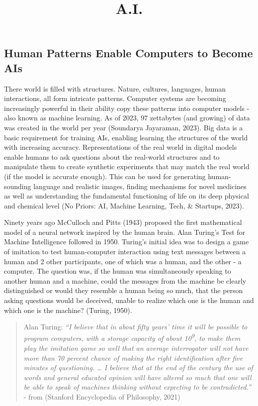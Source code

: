 \documentclass[
  letterpaper,
  DIV=11,
  numbers=noendperiod]{scrartcl}
\title{A.I.}
\author{}
\date{}
\begin{document}
\maketitle

\subsection{Human Patterns Enable Computers to Become
AIs}\label{human-patterns-enable-computers-to-become-ais}

There world is filled with structures. Nature, cultures, languages,
human interactions, all form intricate patterns. Computer systems are
becoming increasingly powerful in their ability copy these patterns into
computer models - also known as machine learning. As of 2023, 97
zettabytes (and growing) of data was created in the world per year
(Soundarya Jayaraman, 2023). Big data is a basic requirement for
training AIs, enabling learning the structures of the world with
increasing accuracy. Representations of the real world in digital models
enable humans to ask questions about the real-world structures and to
manipulate them to create synthetic experiments that may match the real
world (if the model is accurate enough). This can be used for generating
human-sounding language and realistic images, finding mechanisms for
novel medicines as well as understanding the fundamental functioning of
life on its deep physical and chemical level (No Priors: AI, Machine
Learning, Tech, \& Startups, 2023).

Ninety years ago McCulloch and Pitts (1943) proposed the first
mathematical model of a neural network inspired by the human brain. Alan
Turing's Test for Machine Intelligence followed in 1950. Turing's
initial idea was to design a game of imitation to test human-computer
interaction using text messages between a human and 2 other
participants, one of which was a human, and the other - a computer. The
question was, if the human was simultaneously speaking to another human
and a machine, could the messages from the machine be clearly
distinguished or would they resemble a human being so much, that the
person asking questions would be deceived, unable to realize which one
is the human and which one is the machine? (Turing, 1950).

\begin{quote}
Alan Turing: \emph{``I believe that in about fifty years' time it will
be possible to program computers, with a storage capacity of about
10\textsuperscript{9}, to make them play the imitation game so well that
an average interrogator will not have more than 70 percent chance of
making the right identification after five minutes of questioning.
\ldots{} I believe that at the end of the century the use of words and
general educated opinion will have altered so much that one will be able
to speak of machines thinking without expecting to be contradicted.''} -
from (Stanford Encyclopedia of Philosophy, 2021)
\end{quote}
\end{document}
